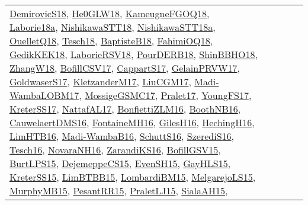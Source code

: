 {\begin{longtable}{lp{3cm}>{\raggedright}p{6cm}>{\raggedright}p{6cm}p{8cm}}
\href{papers/DemirovicS18.pdf}{DemirovicS18}\cite{DemirovicS18}, \href{papers/He0GLW18.pdf}{He0GLW18}\cite{He0GLW18}, \href{papers/KameugneFGOQ18.pdf}{KameugneFGOQ18}\cite{KameugneFGOQ18}, \href{papers/Laborie18a.pdf}{Laborie18a}\cite{Laborie18a}, \href{papers/NishikawaSTT18.pdf}{NishikawaSTT18}\cite{NishikawaSTT18}, \href{papers/NishikawaSTT18a.pdf}{NishikawaSTT18a}\cite{NishikawaSTT18a}, \href{papers/OuelletQ18.pdf}{OuelletQ18}\cite{OuelletQ18}, \href{papers/Tesch18.pdf}{Tesch18}\cite{Tesch18}, \href{articles/BaptisteB18.pdf}{BaptisteB18}\cite{BaptisteB18}, \href{articles/FahimiOQ18.pdf}{FahimiOQ18}\cite{FahimiOQ18}, \href{articles/GedikKEK18.pdf}{GedikKEK18}\cite{GedikKEK18}, \href{articles/LaborieRSV18.pdf}{LaborieRSV18}\cite{LaborieRSV18}, \href{articles/PourDERB18.pdf}{PourDERB18}\cite{PourDERB18}, \href{articles/ShinBBHO18.pdf}{ShinBBHO18}\cite{ShinBBHO18}, \href{articles/ZhangW18.pdf}{ZhangW18}\cite{ZhangW18}, \href{papers/BofillCSV17.pdf}{BofillCSV17}\cite{BofillCSV17}, \href{papers/CappartS17.pdf}{CappartS17}\cite{CappartS17}, \href{papers/GelainPRVW17.pdf}{GelainPRVW17}\cite{GelainPRVW17}, \href{papers/GoldwaserS17.pdf}{GoldwaserS17}\cite{GoldwaserS17}, \href{papers/KletzanderM17.pdf}{KletzanderM17}\cite{KletzanderM17}, \href{papers/LiuCGM17.pdf}{LiuCGM17}\cite{LiuCGM17}, \href{papers/Madi-WambaLOBM17.pdf}{Madi-WambaLOBM17}\cite{Madi-WambaLOBM17}, \href{papers/MossigeGSMC17.pdf}{MossigeGSMC17}\cite{MossigeGSMC17}, \href{papers/Pralet17.pdf}{Pralet17}\cite{Pralet17}, \href{papers/YoungFS17.pdf}{YoungFS17}\cite{YoungFS17}, \href{articles/KreterSS17.pdf}{KreterSS17}\cite{KreterSS17}, \href{articles/NattafAL17.pdf}{NattafAL17}\cite{NattafAL17}, \href{papers/BonfiettiZLM16.pdf}{BonfiettiZLM16}\cite{BonfiettiZLM16}, \href{papers/BoothNB16.pdf}{BoothNB16}\cite{BoothNB16}, \href{papers/CauwelaertDMS16.pdf}{CauwelaertDMS16}\cite{CauwelaertDMS16}, \href{papers/FontaineMH16.pdf}{FontaineMH16}\cite{FontaineMH16}, \href{papers/GilesH16.pdf}{GilesH16}\cite{GilesH16}, \href{papers/HechingH16.pdf}{HechingH16}\cite{HechingH16}, \href{papers/LimHTB16.pdf}{LimHTB16}\cite{LimHTB16}, \href{papers/Madi-WambaB16.pdf}{Madi-WambaB16}\cite{Madi-WambaB16}, \href{papers/SchuttS16.pdf}{SchuttS16}\cite{SchuttS16}, \href{papers/SzerediS16.pdf}{SzerediS16}\cite{SzerediS16}, \href{papers/Tesch16.pdf}{Tesch16}\cite{Tesch16}, \href{articles/NovaraNH16.pdf}{NovaraNH16}\cite{NovaraNH16}, \href{articles/ZarandiKS16.pdf}{ZarandiKS16}\cite{ZarandiKS16}, \href{papers/BofillGSV15.pdf}{BofillGSV15}\cite{BofillGSV15}, \href{papers/BurtLPS15.pdf}{BurtLPS15}\cite{BurtLPS15}, \href{papers/DejemeppeCS15.pdf}{DejemeppeCS15}\cite{DejemeppeCS15}, \href{papers/EvenSH15.pdf}{EvenSH15}\cite{EvenSH15}, \href{papers/GayHLS15.pdf}{GayHLS15}\cite{GayHLS15}, \href{papers/KreterSS15.pdf}{KreterSS15}\cite{KreterSS15}, \href{papers/LimBTBB15.pdf}{LimBTBB15}\cite{LimBTBB15}, \href{papers/LombardiBM15.pdf}{LombardiBM15}\cite{LombardiBM15}, \href{papers/MelgarejoLS15.pdf}{MelgarejoLS15}\cite{MelgarejoLS15}, \href{papers/MurphyMB15.pdf}{MurphyMB15}\cite{MurphyMB15}, \href{papers/PesantRR15.pdf}{PesantRR15}\cite{PesantRR15}, \href{papers/PraletLJ15.pdf}{PraletLJ15}\cite{PraletLJ15}, \href{papers/SialaAH15.pdf}{SialaAH15}\cite{SialaAH15}, 
\end{longtable}}
